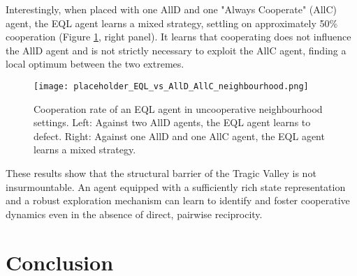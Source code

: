 \documentclass[]{llncs} %
\begin{document}
Interestingly, when placed with one AllD and one "Always Cooperate" (AllC) agent, the EQL agent learns a mixed strategy, settling on approximately 50\% cooperation (Figure \ref{fig:EQL_vs_AllD_AllC_neighbourhood}, right panel). It learns that cooperating does not influence the AllD agent and is not strictly necessary to exploit the AllC agent, finding a local optimum between the two extremes.

\begin{figure}[ht]
    \centering
    \texttt{[image: placeholder\_EQL\_vs\_AllD\_AllC\_neighbourhood.png]}
    \caption{Cooperation rate of an EQL agent in uncooperative neighbourhood settings. Left: Against two AllD agents, the EQL agent learns to defect. Right: Against one AllD and one AllC agent, the EQL agent learns a mixed strategy.}
    \label{fig:EQL_vs_AllD_AllC_neighbourhood}
\end{figure}

These results show that the structural barrier of the Tragic Valley is not insurmountable. An agent equipped with a sufficiently rich state representation and a robust exploration mechanism can learn to identify and foster cooperative dynamics even in the absence of direct, pairwise reciprocity.


\section{Conclusion}
\label{sec:conclusion}




\begin{subappendices} %
\label{app:original_results}


\end{subappendices}
\end{document}
